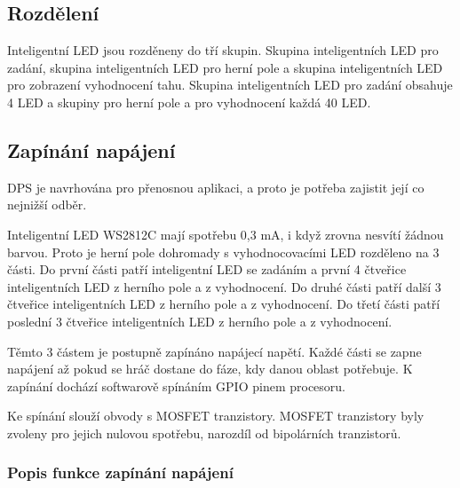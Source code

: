 \subsection{Rozdělení}
Inteligentní LED jsou rozděneny do tří skupin. Skupina inteligentních LED pro zadání, skupina inteligentních LED pro herní pole 
a skupina inteligentních LED pro zobrazení vyhodnocení tahu.
Skupina inteligentních LED pro zadání obsahuje 4 LED a skupiny pro herní pole a pro vyhodnocení každá 40 LED.

\subsection{Zapínání napájení}
DPS je navrhována pro přenosnou aplikaci, a proto je potřeba zajistit její co nejnižší odběr. 

Inteligentní LED WS2812C mají spotřebu 0,3 mA, i když zrovna nesvítí žádnou barvou. Proto je herní pole dohromady s 
vyhodnocovacími LED rozděleno na 3 části. Do první části patří inteligentní LED se zadáním a první 4 čtveřice inteligentních LED 
z herního pole a z vyhodnocení. Do druhé části patří další 3 čtveřice inteligentních LED z herního pole a z vyhodnocení. 
Do třetí části patří poslední 3 čtveřice inteligentních LED z herního pole a z vyhodnocení.

Těmto 3 částem je postupně zapínáno napájecí napětí. Každé části se zapne napájení až pokud se hráč dostane do fáze, kdy 
danou oblast potřebuje. K zapínání dochází softwarově spínáním GPIO pinem procesoru.

Ke spínání slouží obvody s MOSFET tranzistory. MOSFET tranzistory byly zvoleny pro jejich nulovou spotřebu, narozdíl od 
bipolárních tranzistorů. 

\subsubsection{Popis funkce zapínání napájení}

